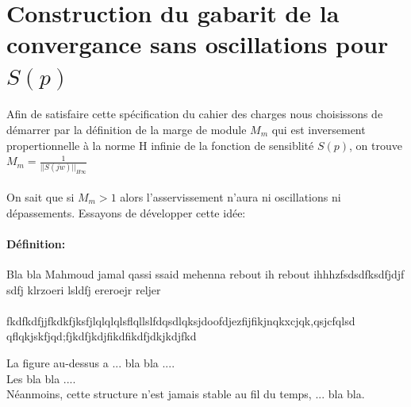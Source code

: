 \documentclass[12pt, a4paper, openany]{report}
\begin{document}
  \begin{center}
    \label{fig6}
  \end{center}
  
 \section{Construction du gabarit de la convergance sans oscillations pour $S(p)$} 
  
  \paragraph{}
  Afin de satisfaire cette spécification du cahier des charges nous choisissons de démarrer par la définition de la marge de module $M_{m} $ qui est inversement propertionnelle à la norme H infinie de la fonction de sensiblité $S(p) $, on trouve $M_{m}=\frac{1}{||S(jw)||_{H\infty}} $ 
  
  \paragraph{}
  On sait que si $ M_{m}>1 $ alors l'asservissement n'aura ni oscillations ni dépassements. Essayons de développer cette idée: \\
  
      
  
  
  
  \paragraph{Définition:}
  
Bla bla Mahmoud jamal qassi ssaid mehenna rebout ih rebout ihhhzfsdsdfksdfjdjf sdfj klrzoeri lsldfj 
ereroejr reljer
  
  \paragraph{}
  fkdfkdfjjfkdkfjksfjlqlqlqlsflqllslfdqsdlqksjdoofdjezfijfikjnqkxcjqk,qsjcfqlsd
  qflqkjskfjqd;fjkdfjkdjfikdfikdfjdkjkdjfkd  
   
 La figure au-dessus a ... bla bla ....\\
 
 Les bla bla ....\\
 
 Néanmoins, cette structure n’est jamais stable au fil du temps, ... bla bla.\\
  
\end{document}
